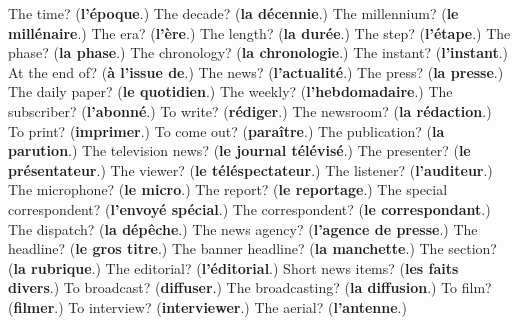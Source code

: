 \begin{tcolorbox}[breakable,colback=teal!4,colframe=teal!35!black,title={Before you move on}]
The time? (\textbf{l'époque}.) The decade? (\textbf{la décennie}.) The millennium? (\textbf{le millénaire}.) The era? (\textbf{l'ère}.) The length? (\textbf{la durée}.) The step? (\textbf{l'étape}.) The phase? (\textbf{la phase}.) The chronology? (\textbf{la chronologie}.) The instant? (\textbf{l'instant}.) At the end of? (\textbf{à l'issue de}.) The news? (\textbf{l'actualité}.) The press? (\textbf{la presse}.) The daily paper? (\textbf{le quotidien}.) The weekly? (\textbf{l'hebdomadaire}.) The subscriber? (\textbf{l'abonné}.) To write? (\textbf{rédiger}.) The newsroom? (\textbf{la rédaction}.) To print? (\textbf{imprimer}.) To come out? (\textbf{paraître}.) The publication? (\textbf{la parution}.) The television news? (\textbf{le journal télévisé}.) The presenter? (\textbf{le présentateur}.) The viewer? (\textbf{le téléspectateur}.) The listener? (\textbf{l'auditeur}.) The microphone? (\textbf{le micro}.) The report? (\textbf{le reportage}.) The special correspondent? (\textbf{l'envoyé spécial}.) The correspondent? (\textbf{le correspondant}.) The dispatch? (\textbf{la dépêche}.) The news agency? (\textbf{l'agence de presse}.) The headline? (\textbf{le gros titre}.) The banner headline? (\textbf{la manchette}.) The section? (\textbf{la rubrique}.) The editorial? (\textbf{l'éditorial}.) Short news items? (\textbf{les faits divers}.) To broadcast? (\textbf{diffuser}.) The broadcasting? (\textbf{la diffusion}.) To film? (\textbf{filmer}.) To interview? (\textbf{interviewer}.) The aerial? (\textbf{l'antenne}.)
\end{tcolorbox}
